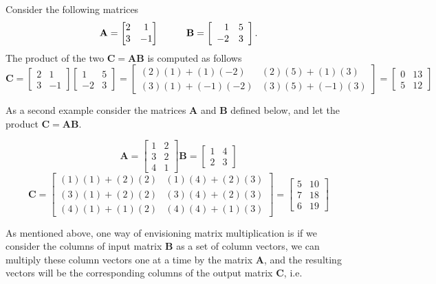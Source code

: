 Consider the following matrices
\[ \mathbf{A} = \begin{bmatrix} 2 & 1 \\ 3 & -1\end{bmatrix} \hspace{1cm}
\mathbf{B} =
\left[\begin{array}{rr}
1 & 5 \\
-2 & 3
\end{array}\right].
\]
The product of the two $\mathbf{C} = \mathbf{AB}$ is computed as follows
\[ \mathbf{C} =
\left[\begin{array}{rr}
2 & 1 \\
3 & -1
\end{array}\right]
\left[\begin{array}{rr}
1 & 5 \\
-2 & 3
\end{array}\right]
=
\left[
\begin{array}{cc}
(2)(1) + (1)(-2) & (2)(5) + (1)(3) \\
(3)(1) + (-1)(-2)  & (3)(5)  + (-1)(3)
\end{array}
\right]
=
\left[
\begin{array}{rr}
0 & 13 \\
5 & 12
\end{array}
\right]
\]

As a second example consider the matrices $\mathbf{A}$ and $\mathbf{B}$ defined below, and let the product $\mathbf{C} = \mathbf{AB}$.

\[
\mathbf{A} =
\begin{bmatrix}
1 & 2 \\
3 & 2 \\
4 & 1
\end{bmatrix}
\mathbf{B} =
\begin{bmatrix}
1 & 4 \\
2 & 3
\end{bmatrix}
\]
\[
\mathbf{C} =
\begin{bmatrix}
(1)(1) + (2)(2) & (1)(4)+(2)(3) \\
(3)(1) + (2)(2) & (3)(4)+(2)(3) \\
(4)(1) + (1)(2) & (4)(4)+(1)(3)
\end{bmatrix}
 = \begin{bmatrix}
5 & 10 \\
7 & 18 \\
6 & 19
\end{bmatrix}
\]

As mentioned above, one way of envisioning matrix multiplication is if we consider the columns of input matrix $\mathbf{B}$ as a set of column vectors, we can multiply  these column vectors one at a time by the matrix $\mathbf{A}$, and the resulting vectors will be the corresponding columns of the output matrix $\mathbf{C}$, i.e.

